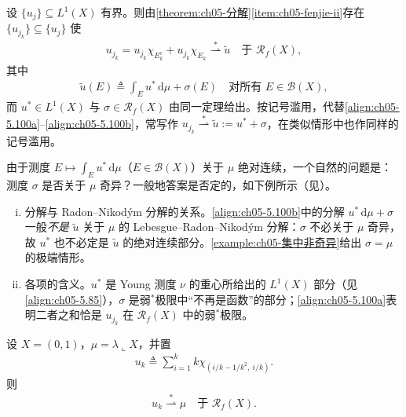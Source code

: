 \documentclass[../../main.tex]{subfiles}
\begin{document}
\begin{remark}\label{remark:ch05-5.4.4}
设 $\{u_j\}\subseteq L^1(X)$ 有界。则由\cref{theorem:ch05-分解}\cref{item:ch05-fenjie-ii}存在 $\{u_{j_k}\}\subseteq\{u_j\}$ 使
\begin{align}
u_{j_k}=u_{j_k}\chi_{E_k^c}+u_{j_k}\chi_{E_k}\stackrel{*}{\rightharpoonup}\tilde u
\quad\text{于 }\mathscr{R}_f(X),\label{align:ch05-5.100a}
\end{align}
其中
\begin{align}
\tilde u(E)\triangleq\int_Eu^*\,\mathrm{d}\mu+\sigma(E)
\quad\text{对所有 }E\in\mathscr{B}(X),\label{align:ch05-5.100b}
\end{align}
而 $u^*\in L^1(X)$ 与 $\sigma\in\mathscr{R}_f(X)$ 由同一定理给出。按记号滥用，代替\eqref{align:ch05-5.100a}--\eqref{align:ch05-5.100b}，常写作 $u_{j_k}\stackrel{*}{\rightharpoonup}\tilde u:=u^*+\sigma$，在类似情形中也作同样的记号滥用。

由于测度 $E\mapsto\int_Eu^*\,\mathrm{d}\mu$（$E\in\mathscr{B}(X)$）关于 $\mu$ 绝对连续，一个自然的问题是：测度 $\sigma$ 是否关于 $\mu$ 奇异？一般地答案是否定的，如下例所示（见\cite{ref04,ref09}）。

\begin{enumerate}[(i)]
\item 分解与 Radon--Nikodým 分解的关系。\eqref{align:ch05-5.100b}中的分解 $u^*\,\mathrm{d}\mu+\sigma$ 一般\emph{不是} $\tilde u$ 关于 $\mu$ 的 Lebesgue--Radon--Nikodým 分解：$\sigma$ 不必关于 $\mu$ 奇异，故 $u^*$ 也不必定是 $\tilde u$ 的绝对连续部分。\cref{example:ch05-集中非奇异}给出 $\sigma=\mu$ 的极端情形。

\item 各项的含义。$u^*$ 是 Young 测度 $\nu$ 的重心所给出的 $L^1(X)$ 部分（见\eqref{align:ch05-5.85}），$\sigma$ 是弱$^*$极限中“不再是函数”的部分；\eqref{align:ch05-5.100a}表明二者之和恰是 $u_{j_k}$ 在 $\mathscr{R}_f(X)$ 中的弱$^*$极限。
\end{enumerate}
\end{remark}

\begin{example}\label{example:ch05-集中非奇异}
设 $X=(0,1)$，$\mu=\lambda\llcorner X$，并置
\begin{align*}
u_k\triangleq\sum_{i=1}^kk\chi_{(i/k-1/k^2,\ i/k)}.
\end{align*}
则
\begin{align}
u_k\stackrel{*}{\rightharpoonup}\mu\quad\text{于 }\mathscr{R}_f(X).\label{align:ch05-5.101}
\end{align}
\end{example}
\end{document}
